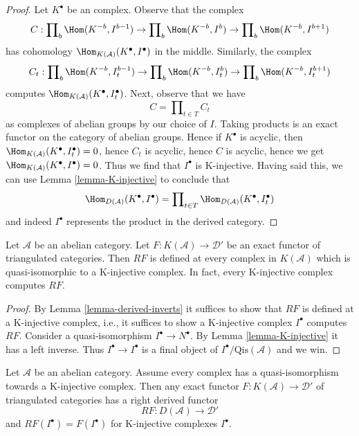 \begin{proof}
Let $K^\bullet$ be an complex. Observe that the complex
$$
C :
\prod\nolimits_b \Hom(K^{-b}, I^{b - 1}) \to
\prod\nolimits_b \Hom(K^{-b}, I^b) \to
\prod\nolimits_b \Hom(K^{-b}, I^{b + 1})
$$
has cohomology $\Hom_{K(\mathcal{A})}(K^\bullet, I^\bullet)$
in the middle. Similarly, the complex
$$
C_t :
\prod\nolimits_b \Hom(K^{-b}, I_t^{b - 1}) \to
\prod\nolimits_b \Hom(K^{-b}, I_t^b) \to
\prod\nolimits_b \Hom(K^{-b}, I_t^{b + 1})
$$
computes $\Hom_{K(\mathcal{A})}(K^\bullet, I_t^\bullet)$.
Next, observe that we have
$$
C = \prod\nolimits_{t \in T} C_t
$$
as complexes of abelian groups by our choice of $I$.
Taking products is an exact functor on the
category of abelian groups. Hence if $K^\bullet$ is acyclic, then
$\Hom_{K(\mathcal{A})}(K^\bullet, I_t^\bullet) = 0$, hence
$C_t$ is acyclic, hence $C$ is acyclic, hence we get
$\Hom_{K(\mathcal{A})}(K^\bullet, I^\bullet) = 0$.
Thus we find that $I^\bullet$ is K-injective.
Having said this, we can use Lemma \ref{lemma-K-injective}
to conclude that
$$
\Hom_{D(\mathcal{A})}(K^\bullet, I^\bullet)
=
\prod\nolimits_{t \in T} \Hom_{D(\mathcal{A})}(K^\bullet, I_t^\bullet)
$$
and indeed $I^\bullet$ represents the product in the derived category.
\end{proof}

\begin{lemma}
\label{lemma-K-injective-defined}
Let $\mathcal{A}$ be an abelian category.
Let $F : K(\mathcal{A}) \to \mathcal{D}'$ be an exact functor
of triangulated categories. Then $RF$ is defined at every complex
in $K(\mathcal{A})$ which is quasi-isomorphic to a
K-injective complex. In fact, every K-injective complex computes $RF$.
\end{lemma}

\begin{proof}
By
Lemma \ref{lemma-derived-inverts}
it suffices to show that $RF$ is defined at a K-injective complex,
i.e., it suffices to show a K-injective complex $I^\bullet$ computes $RF$.
Consider a quasi-isomorphism $I^\bullet \to N^\bullet$. By
Lemma \ref{lemma-K-injective} it has a left inverse.
Thus $I^\bullet \to I^\bullet$ is a final object of
$I^\bullet/\text{Qis}(\mathcal{A})$ and we win.
\end{proof}

\begin{lemma}
\label{lemma-enough-K-injectives-implies}
Let $\mathcal{A}$ be an abelian category.
Assume every complex has a quasi-isomorphism towards a K-injective complex.
Then any exact functor $F : K(\mathcal{A}) \to \mathcal{D}'$ of triangulated
categories has a right derived functor
$$
RF : D(\mathcal{A}) \longrightarrow \mathcal{D}'
$$
and $RF(I^\bullet) = F(I^\bullet)$ for K-injective complexes $I^\bullet$.
\end{lemma}

